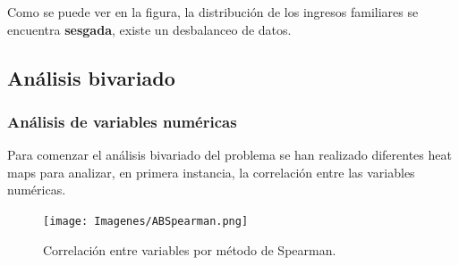 \documentclass[a4paper]{article}
\begin{document}
           
           
           
           
             Como se puede ver en la figura, la distribución de los ingresos familiares se encuentra \textbf{sesgada}, existe un desbalanceo de datos.

    
    \newpage
    
    \subsection{Análisis bivariado}
        \subsubsection{Análisis de variables numéricas}
 
        Para comenzar el análisis bivariado del problema se han realizado diferentes heat maps para analizar, en primera instancia, la correlación entre las variables numéricas.        
       
        \begin{figure}[H]
                \centering
            \texttt{[image: Imagenes/ABSpearman.png]}
            \caption{Correlación entre variables por método de Spearman.}
            \label{AB Spearman Correlation}
        \end{figure}
 
\end{document}
